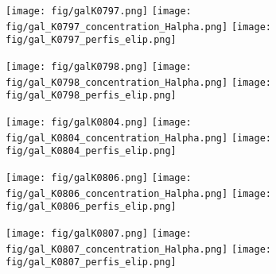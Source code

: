 \begin{figure}[!ht]
\begin{center}
\setcaptionmargin{1cm}
\texttt{[image: fig/galK0797.png]}
\texttt{[image: fig/gal\_K0797\_concentration\_Halpha.png]}
\texttt{[image: fig/gal\_K0797\_perfis\_elip.png]}
\end{center}
\end{figure}


\begin{figure}[!ht]
\begin{center}
\setcaptionmargin{1cm}
\texttt{[image: fig/galK0798.png]}
\texttt{[image: fig/gal\_K0798\_concentration\_Halpha.png]}
\texttt{[image: fig/gal\_K0798\_perfis\_elip.png]}
\end{center}
\end{figure}


\begin{figure}[!ht]
\begin{center}
\setcaptionmargin{1cm}
\texttt{[image: fig/galK0804.png]}
\texttt{[image: fig/gal\_K0804\_concentration\_Halpha.png]}
\texttt{[image: fig/gal\_K0804\_perfis\_elip.png]}
\end{center}
\end{figure}


\begin{figure}[!ht]
\begin{center}
\setcaptionmargin{1cm}
\texttt{[image: fig/galK0806.png]}
\texttt{[image: fig/gal\_K0806\_concentration\_Halpha.png]}
\texttt{[image: fig/gal\_K0806\_perfis\_elip.png]}
\end{center}
\end{figure}


\begin{figure}[!ht]
\begin{center}
\setcaptionmargin{1cm}
\texttt{[image: fig/galK0807.png]}
\texttt{[image: fig/gal\_K0807\_concentration\_Halpha.png]}
\texttt{[image: fig/gal\_K0807\_perfis\_elip.png]}
\end{center}
\end{figure}


